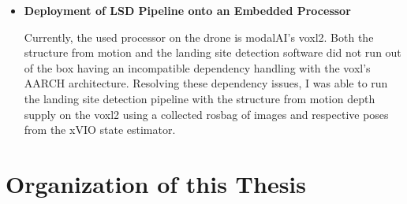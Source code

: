 \begin{itemize}
    \item \textbf{Deployment of LSD Pipeline onto an Embedded Processor}

    Currently, the used processor on the drone is modalAI's voxl2. Both the structure from motion and the landing site detection software did not run out of the box having an incompatible dependency handling with the voxl's AARCH architecture. Resolving these dependency issues, I was able to run the landing site detection pipeline with the structure from motion depth supply on the voxl2 using a collected rosbag of images and respective poses from the xVIO state estimator.
\end{itemize}

\section{Organization of this Thesis}
